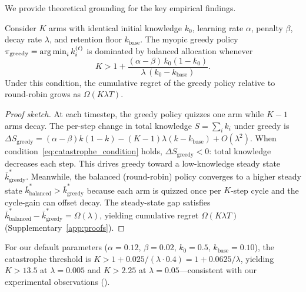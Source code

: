 We provide theoretical grounding for the key empirical findings.

\begin{theorem}
\label{thm:catastrophe}
Consider $K$ arms with identical initial knowledge $k_0$, learning rate $\alpha$, penalty $\beta$, decay rate $\lambda$, and retention floor $k_{\mathrm{base}}$. The myopic greedy policy $\pi_{\mathrm{greedy}} = \operatorname*{arg\,min}_i k_i^{(t)}$ is dominated by balanced allocation whenever
\begin{equation}
    K > 1 + \frac{(\alpha - \beta)\, k_0 (1 - k_0)}{\lambda\,(k_0 - k_{\mathrm{base}})}.
    \label{eq:catastrophe_condition}
\end{equation}
Under this condition, the cumulative regret of the greedy policy relative to round-robin grows as $\Omega(K \lambda T)$.
\end{theorem}

\begin{proof}[Proof sketch]
At each timestep, the greedy policy quizzes one arm while $K{-}1$ arms decay. The per-step change in total knowledge $S = \sum_i k_i$ under greedy is $\Delta S_{\mathrm{greedy}} = (\alpha-\beta)k(1-k) - (K-1)\lambda(k-k_{\mathrm{base}}) + O(\lambda^2)$. When condition~\eqref{eq:catastrophe_condition} holds, $\Delta S_{\mathrm{greedy}} < 0$: total knowledge decreases each step. This drives greedy toward a low-knowledge steady state $\bar{k}_{\mathrm{greedy}}^*$. Meanwhile, the balanced (round-robin) policy converges to a higher steady state $\bar{k}_{\mathrm{balanced}}^* > \bar{k}_{\mathrm{greedy}}^*$ because each arm is quizzed once per $K$-step cycle and the cycle-gain can offset decay. The steady-state gap satisfies $\bar{k}_{\mathrm{balanced}}^* - \bar{k}_{\mathrm{greedy}}^* = \Omega(\lambda)$, yielding cumulative regret $\Omega(K\lambda T)$ (Supplementary~\ref{app:proofs}).
\end{proof}

For our default parameters ($\alpha{=}0.12$, $\beta{=}0.02$, $k_0{=}0.5$, $k_{\mathrm{base}}{=}0.10$), the catastrophe threshold is $K > 1 + 0.025/(\lambda \cdot 0.4) = 1 + 0.0625/\lambda$, yielding $K > 13.5$ at $\lambda{=}0.005$ and $K > 2.25$ at $\lambda{=}0.05$---consistent with our experimental observations ().

